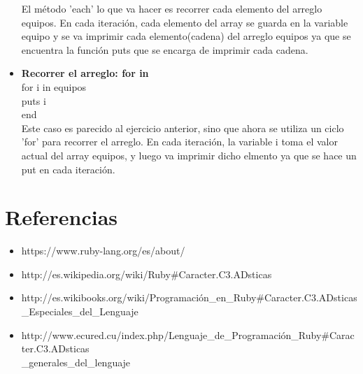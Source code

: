 \documentclass[11pt]{article} %
\begin{document}
\begin{itemize}
     El método 'each' lo que va hacer es recorrer cada elemento del arreglo equipos. En cada iteración, cada elemento del array se guarda en la variable equipo y se va imprimir cada elemento(cadena) del arreglo equipos ya que se encuentra la función puts que se encarga de        imprimir cada cadena.

     \item {\bf Recorrer el arreglo: for in}\\
	\hspace*{7mm} for i in equipos\\
  	\hspace*{14mm}  puts i\\
	\hspace*{7mm} end\\
     \hspace*{7mm} Este caso es parecido al ejercicio anterior, sino que ahora se utiliza un ciclo 'for' para recorrer el arreglo. En cada iteración, la variable i toma el valor actual del array equipos, y luego va imprimir dicho elmento ya que se hace un put en cada iteración.\\

\end{itemize}


\section{\bf Referencias}
\begin{itemize}
          \item  https://www.ruby-lang.org/es/about/ \\
	\item http://es.wikipedia.org/wiki/Ruby\#Caracter.C3.ADsticas \\
	\item  http://es.wikibooks.org/wiki/Programación\_en\_Ruby\#Caracter.C3.ADsticas\\
\_Especiales\_del\_Lenguaje \\
	 \item http://www.ecured.cu/index.php/Lenguaje\_de\_Programación\_Ruby\#Caracter.C3.ADsticas\\
\_generales\_del\_lenguaje \\

\end{itemize}
\end{document}
